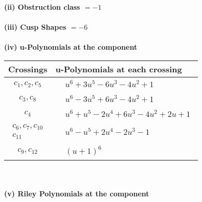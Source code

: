 \documentclass[1p]{elsarticle_modified}
\theoremstyle{definition}
\begin{document}
\flushleft \textbf{(ii) Obstruction class $= -1$}\\~\\
\flushleft \textbf{(iii) Cusp Shapes $= -6$}\\~\\
\newpage\renewcommand{\arraystretch}{1}
\flushleft \textbf{(iv) u-Polynomials at the component}\newline \\
\begin{tabular}{m{50pt}|m{274pt}}
Crossings & \hspace{64pt}u-Polynomials at each crossing \\
\hline $$\begin{aligned}c_{1},c_{2},c_{5}\end{aligned}$$&$\begin{aligned}
&u^6+3 u^5-6 u^3-4 u^2+1
\end{aligned}$\\
\hline $$\begin{aligned}c_{3},c_{8}\end{aligned}$$&$\begin{aligned}
&u^6-3 u^5+6 u^3-4 u^2+1
\end{aligned}$\\
\hline $$\begin{aligned}c_{4}\end{aligned}$$&$\begin{aligned}
&u^6+u^5-2 u^4+6 u^3-4 u^2+2 u+1
\end{aligned}$\\
\hline $$\begin{aligned}c_{6},c_{7},c_{10}\\c_{11}\end{aligned}$$&$\begin{aligned}
&u^6- u^5+2 u^4-2 u^3-1
\end{aligned}$\\
\hline $$\begin{aligned}c_{9},c_{12}\end{aligned}$$&$\begin{aligned}
&(u+1)^6
\end{aligned}$\\
\hline
\end{tabular}\\~\\
\newpage\renewcommand{\arraystretch}{1}
\flushleft \textbf{(v) Riley Polynomials at the component}\newline \\
\end{document}
